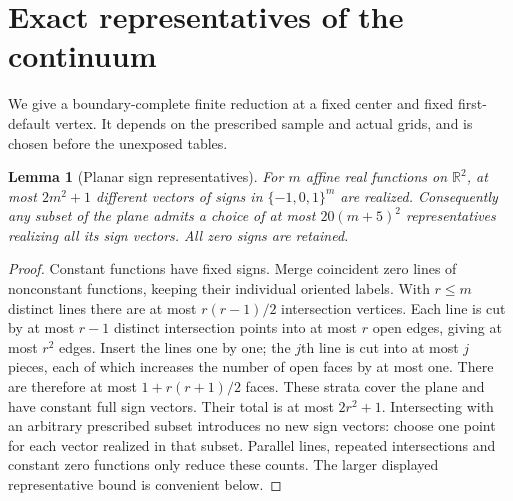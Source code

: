 \documentclass[11pt]{article}
\newtheorem{lemma}[theorem]{Lemma}
\theoremstyle{definition}
\theoremstyle{remark}
\newcommand{\R}{\mathbb R}
\begin{document}
\section{Exact representatives of the continuum}\label{sec:representatives}
We give a boundary-complete finite reduction at a fixed center and fixed
first-default vertex. It depends on the prescribed sample and actual grids,
and is chosen before the unexposed tables.

\begin{lemma}[Planar sign representatives]\label{lem:arrangement}
For $m$ affine real functions on $\R^2$, at most $2m^2+1$ different vectors
of signs in $\{-1,0,1\}^m$ are realized. Consequently any subset of the plane
admits a choice of at most $20(m+5)^2$ representatives realizing all its sign
vectors. All zero signs are retained.
\end{lemma}
\begin{proof}
Constant functions have fixed signs. Merge coincident zero lines of nonconstant
functions, keeping their individual oriented labels. With $r\leq m$ distinct
lines there are at most $r(r-1)/2$ intersection vertices. Each line is cut by
at most $r-1$ distinct intersection points into at most $r$ open edges, giving
at most $r^2$ edges. Insert the lines one by one; the $j$th line is cut into
at most $j$ pieces, each of which increases the number of open faces by at
most one. There are therefore at most $1+r(r+1)/2$ faces. These strata cover
the plane and have constant full sign vectors. Their total is at most
$2r^2+1$. Intersecting with an arbitrary prescribed subset introduces no new
sign vectors: choose one point for each vector realized in that subset.
Parallel lines, repeated intersections and constant zero functions only reduce
these counts. The larger displayed representative bound is convenient below.
\end{proof}
\end{document}
